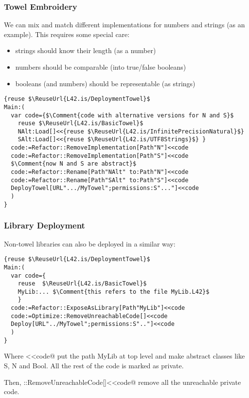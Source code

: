\begin{frame}[fragile]
\frametitle{Towel Embroidery}
We can mix and match different implementations for numbers and strings (as an example).
This requires some special care:
\begin{itemize}
\item strings should know their length (as a number)
\item numbers should be comparable (into true/false booleans)
\item booleans (and numbers) should be representable (as strings)
\end{itemize}
\begin{NiceCode}{59ex}{0.9}
\begin{lstlisting}
{reuse $\ReuseUrl{L42.is/DeploymentTowel}$
Main:(
  var code={$\Comment{code with alternative versions for N and S}$
    reuse $\ReuseUrl{L42.is/BasicTowel}$
    NAlt:Load[]<<{reuse $\ReuseUrl{L42.is/InfinitePrecisionNatural}$}
    SAlt:Load[]<<{reuse $\ReuseUrl{L42.is/UTF8Strings}$} }
  code:=Refactor::RemoveImplementation[Path"N"]<<code
  code:=Refactor::RemoveImplementation[Path"S"]<<code
  $\Comment{now N and S are abstract}$
  code:=Refactor::Rename[Path"NAlt" to:Path"N"]<<code
  code:=Refactor::Rename[Path"SAlt" to:Path"S"]<<code
  DeployTowel[URL".../MyTowel";permissions:S"..."]<<code
  )
}
\end{lstlisting}
\end{NiceCode}

\end{frame}
\begin{frame}[fragile]
\frametitle{Library Deployment}

Non-towel libraries can also be deployed in a similar way:
\begin{NiceCode}{59ex}{0.9}
\begin{lstlisting}
{reuse $\ReuseUrl{L42.is/DeploymentTowel}$
Main:(
  var code={
    reuse  $\ReuseUrl{L42.is/BasicTowel}$
    MyLib:... $\Comment{this refers to the file MyLib.L42}$
    }
  code:=Refactor::ExposeAsLibrary[Path"MyLib"]<<code
  code:=Optimize::RemoveUnreachableCode[]<<code
  Deploy[URL"../MyTowel";permissions:S".."]<<code
  )
}
\end{lstlisting}
\end{NiceCode}
Where <<code@
put the path MyLib at top level and make abstract classes like S, N and Bool.
All the rest of the code is marked as private.

Then, \Q@Optimize::RemoveUnreachableCode[]<<code@ remove all the unreachable private code.

\end{frame}




